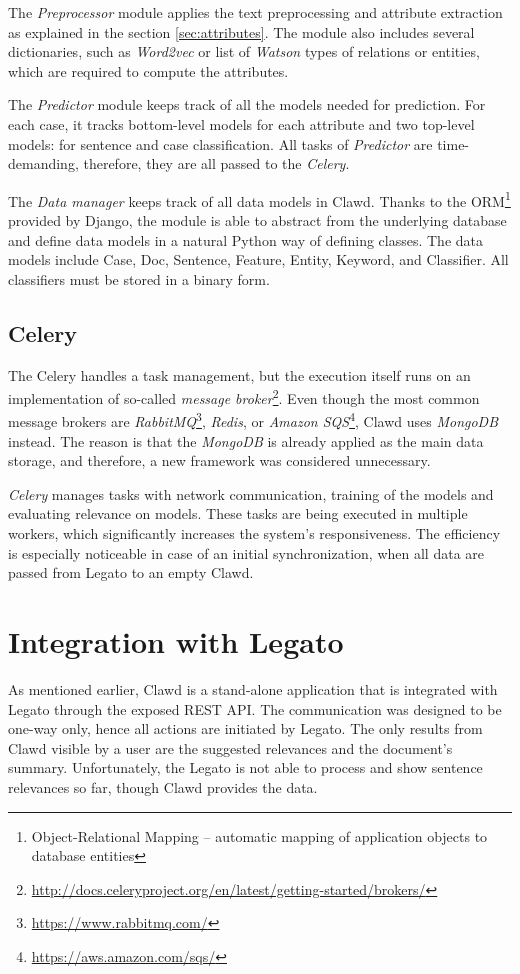 \documentclass[
  digital, %
  notable,   %
  nolof,     %
  nolot,     %
]{fithesis3}
\begin{document}
The \textit{Preprocessor} module applies the text preprocessing and attribute extraction as explained in the section \ref{sec:attributes}.
The module also includes several dictionaries, such as \textit{Word2vec} or list of \textit{Watson} types of relations or entities, which are required to compute the attributes.

The \textit{Predictor} module keeps track of all the models needed for prediction.
For each case, it tracks bottom-level models for each attribute and two top-level models: for sentence and case classification.
All tasks of \textit{Predictor} are time-demanding, therefore, they are all passed to the \textit{Celery}.

The \textit{Data manager} keeps track of all data models in Clawd.
Thanks to the ORM\footnote{Object-Relational Mapping -- automatic mapping of application objects to database entities} provided by Django, the module is able to abstract from the underlying database and define data models in a natural Python way of defining classes.
The data models include Case, Doc, Sentence, Feature, Entity, Keyword, and Classifier.
All classifiers must be stored in a binary form.

\subsection{Celery}
The Celery handles a task management, but the execution itself runs on an implementation of so-called \textit{message broker}\footnote{\url{http://docs.celeryproject.org/en/latest/getting-started/brokers/}}.
Even though the most common message brokers are \textit{RabbitMQ}\footnote{\url{https://www.rabbitmq.com/}}, \textit{Redis}, or \textit{Amazon SQS}\footnote{\url{https://aws.amazon.com/sqs/}}, Clawd uses \textit{MongoDB} instead.
The reason is that the \textit{MongoDB} is already applied as the main data storage, and therefore, a new framework was considered unnecessary.

\textit{Celery} manages tasks with network communication, training of the models and evaluating relevance on models.
These tasks are being executed in multiple workers, which significantly increases the system's responsiveness.
The efficiency is especially noticeable in case of an initial synchronization, when all data are passed from Legato to an empty Clawd.


\section{Integration with Legato}
As mentioned earlier, Clawd is a stand-alone application that is integrated with Legato through the exposed REST API.
The communication was designed to be one-way only, hence all actions are initiated by Legato.
The only results from Clawd visible by a user are the suggested relevances and the document's summary.
Unfortunately, the Legato is not able to process and show sentence relevances so far, though Clawd provides the data.
\end{document}
